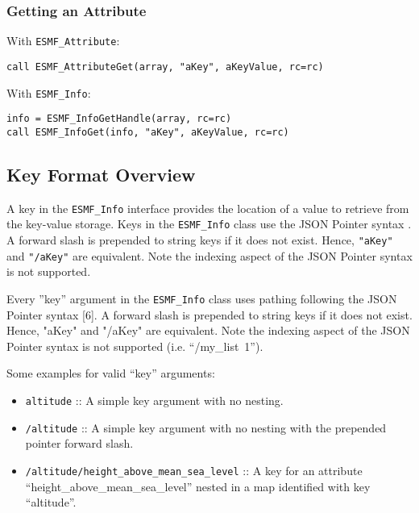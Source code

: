 \subsubsection{Getting an Attribute}
With \texttt{ESMF\_Attribute}:
\begin{verbatim}
call ESMF_AttributeGet(array, "aKey", aKeyValue, rc=rc)
\end{verbatim}
With \texttt{ESMF\_Info}:
\begin{verbatim}
info = ESMF_InfoGetHandle(array, rc=rc)
call ESMF_InfoGet(info, "aKey", aKeyValue, rc=rc)
\end{verbatim}

\subsection{Key Format Overview}
\label{info_key_format}
A key in the \texttt{ESMF\_Info} interface provides the location of a value to retrieve from the key-value storage. Keys in the \texttt{ESMF\_Info} class use the JSON Pointer syntax \cite{json_for_modern_cpp_json_pointer}. A forward slash is prepended to string keys if it does not exist. Hence, \texttt{"aKey"} and \texttt{"/aKey"} are equivalent. Note the indexing aspect of the JSON Pointer syntax is not supported.

Every ”key” argument in the \texttt{ESMF\_Info} class uses pathing following the JSON Pointer syntax [6]. A forward slash is prepended to string keys if it does not exist. Hence, "aKey" and "/aKey" are equivalent. Note the indexing aspect of the JSON Pointer syntax is not supported (i.e. “/my\_list~1”).

Some examples for valid “key” arguments:
\begin{itemize}
    \item \texttt{altitude} :: A simple key argument with no nesting.
    \item \texttt{/altitude} :: A simple key argument with no nesting with the prepended pointer forward slash.
    \item \texttt{/altitude/height\_above\_mean\_sea\_level} :: A key for an attribute “height\_above\_mean\_sea\_level” nested in a map identified with key “altitude”.
\end{itemize}